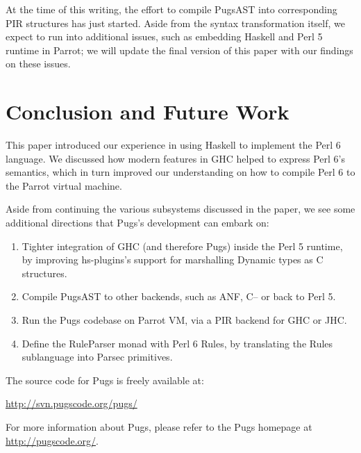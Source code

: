 \documentclass[]{sigplanconf}
\begin{document}
At the time of this writing, the effort to compile PugsAST into corresponding
PIR structures has just started.  Aside from the syntax transformation itself,
we expect to run into additional issues, such as embedding Haskell and Perl 5
runtime in Parrot; we will update the final version of this paper with our
findings on these issues.

\section{Conclusion and Future Work}
\label{sec:ConclusionandFutureWork}

This paper introduced our experience in using Haskell to implement the Perl 6
language.  We discussed how modern features in GHC helped to express Perl 6's
semantics, which in turn improved our understanding on how to compile Perl 6
to the Parrot virtual machine.

Aside from continuing the various subsystems discussed in the paper, we see
some additional directions that Pugs's development can embark on: 

\begin{enumerate}
\item Tighter integration of GHC (and therefore Pugs) inside the Perl 5
runtime, by improving hs-plugins's support for marshalling Dynamic types as
C structures.
\item Compile PugsAST to other backends, such as ANF, C-- or back to Perl 5.
\item Run the Pugs codebase on Parrot VM, via a PIR backend for GHC or JHC.
\item Define the RuleParser monad with Perl 6 Rules, by translating the Rules
sublanguage into Parsec primitives.
\end{enumerate}

The source code for Pugs is freely available at:

\begin{center}
\url{http://svn.pugscode.org/pugs/}
\end{center}

For more information about Pugs, please refer to the Pugs homepage at
\url{http://pugscode.org/}.



\acks
\end{document}

